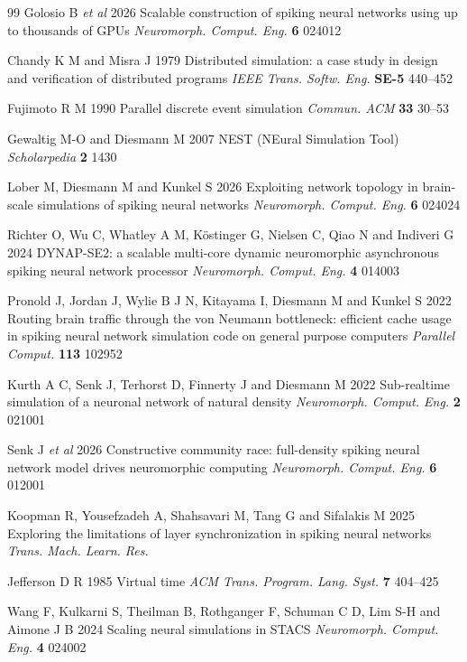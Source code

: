 \documentclass{iopjournal}
\begin{document}
\begin{thebibliography}{99}
 Golosio B \textit{et al} 2026 Scalable construction of spiking neural networks using up to thousands of GPUs \textit{Neuromorph. Comput. Eng.} \textbf{6} 024012

 Chandy K M and Misra J 1979 Distributed simulation: a case study in design and verification of distributed programs \textit{IEEE Trans. Softw. Eng.} \textbf{SE-5} 440--452

 Fujimoto R M 1990 Parallel discrete event simulation \textit{Commun. ACM} \textbf{33} 30--53

 Gewaltig M-O and Diesmann M 2007 NEST (NEural Simulation Tool) \textit{Scholarpedia} \textbf{2} 1430

 Lober M, Diesmann M and Kunkel S 2026 Exploiting network topology in brain-scale simulations of spiking neural networks \textit{Neuromorph. Comput. Eng.} \textbf{6} 024024

 Richter O, Wu C, Whatley A M, K\"ostinger G, Nielsen C, Qiao N and Indiveri G 2024 DYNAP-SE2: a scalable multi-core dynamic neuromorphic asynchronous spiking neural network processor \textit{Neuromorph. Comput. Eng.} \textbf{4} 014003

 Pronold J, Jordan J, Wylie B J N, Kitayama I, Diesmann M and Kunkel S 2022 Routing brain traffic through the von Neumann bottleneck: efficient cache usage in spiking neural network simulation code on general purpose computers \textit{Parallel Comput.} \textbf{113} 102952

 Kurth A C, Senk J, Terhorst D, Finnerty J and Diesmann M 2022 Sub-realtime simulation of a neuronal network of natural density \textit{Neuromorph. Comput. Eng.} \textbf{2} 021001

 Senk J \textit{et al} 2026 Constructive community race: full-density spiking neural network model drives neuromorphic computing \textit{Neuromorph. Comput. Eng.} \textbf{6} 012001

 Koopman R, Yousefzadeh A, Shahsavari M, Tang G and Sifalakis M 2025 Exploring the limitations of layer synchronization in spiking neural networks \textit{Trans. Mach. Learn. Res.}

 Jefferson D R 1985 Virtual time \textit{ACM Trans. Program. Lang. Syst.} \textbf{7} 404--425

 Wang F, Kulkarni S, Theilman B, Rothganger F, Schuman C D, Lim S-H and Aimone J B 2024 Scaling neural simulations in STACS \textit{Neuromorph. Comput. Eng.} \textbf{4} 024002


\end{thebibliography}
\end{document}
